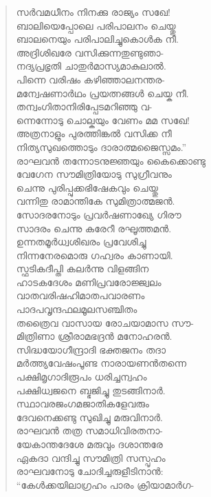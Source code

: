 \begin{verse}
സര്‍വമധീനം നിനക്കു രാജ്യം സഖേ!\\
ബാലിയെപ്പോലെ പരിപാലനം ചെയ്തു\\
ബാലനെയും പരിപാലിച്ചുകൊള്‍ക നീ.\\
അദ്രിശിഖരേ വസിക്കുന്നതുണ്ടുഞാ-\\
നദ്യപ്രഭൃതി ചാതുര്‍മാസ്യമാകുലാല്‍.\\
പിന്നെ വരിഷം കഴിഞ്ഞാലനന്തര-\\
മന്വേഷണാര്‍ഥം പ്രയത്നങ്ങള്‍ ചെയ്ക നീ.\\
തന്വംഗിതാനിരിപ്പേടമറിഞ്ഞു വ-\\
ന്നെന്നോടു ചൊല്കയും വേണം മമ സഖേ!\\
അത്രനാളും പുരത്തിങ്കല്‍ വസിക്ക നീ\\
നിത്യസുഖത്തൊടും ദാരാത്മജൈസ്സമം.”\\
രാഘവന്‍ തന്നോടനുജ്ഞയും കൈക്കൊണ്ടു\\
വേഗേന സൗമിത്രിയോടു സുഗ്രീവനും\\
ചെന്നു പുരിപ്പുക്കഭിഷേകവും ചെയ്തു\\
വന്നിതു രാമാന്തികേ സുമിത്രാത്മജന്‍.\\
സോദരനോടും പ്രവര്‍ഷണാഖ്യേ ഗിരൗ\\
സാദരം ചെന്നു കരേറീ രഘൂത്തമന്‍.\\
ഉന്നതമൂര്‍ധ്വശിഖരം പ്രവേശിച്ചു\\
നിന്നനേരമൊരു ഗഹ്വരം കാണായി.\\
സ്ഫടികദീപ്തി കലര്‍ന്നു വിളങ്ങിന\\
ഹാടകദേശം മണിപ്രവരോജ്ജ്വലം\\
വാതവരിഷഹിമാതപവാരണം\\
പാദപവൃന്ദഫലമൂലസഞ്ചിതം\\
തത്രൈവ വാസായ രോചയാമാസ സൗ-\\
മിത്രിണാ ശ്രീരാമഭദ്രന്‍ മനോഹരന്‍.\\
സിദ്ധയോഗീന്ദ്രാദി ഭക്തജനം തദാ\\
മര്‍ത്ത്യവേഷംപൂണ്ട നാരായണന്‍തന്നെ\\
പക്ഷിമൃഗാദിരൂപം ധരിച്ചന്വഹം\\
പക്ഷിധ്വജനെ ബ്ഭജിച്ചു തുടങ്ങിനാര്‍.\\
സ്ഥാവരജംഗമജാതികളേവരും\\
ദേവനെക്കണ്ടു സുഖിച്ചു മരുവിനാര്‍.\\
രാഘവന്‍ തത്ര സമാധിവിരതനാ-\\
യേകാന്തദേശേ മരുവും ദശാന്തരേ\\
ഏകദാ വന്ദിച്ചു സൗമിത്രി സസ്പൃഹം\\
രാഘവനോടു ചോദിച്ചരുളീടിനാന്‍:\\
“കേള്‍ക്കയിലാഗ്രഹം പാരം ക്രിയാമാര്‍ഗ-\\

\end{verse}
